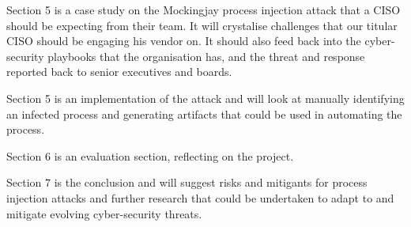 Section 5 is a case study on the Mockingjay process injection attack that a CISO should be expecting from their team.  It will crystalise challenges
that our titular CISO should be engaging his vendor on.  It should also feed back into the cyber-security playbooks that the organisation has, and
the threat and response reported back to senior executives and boards.


Section 5 is an implementation of the attack and will look at manually identifying an infected process and generating artifacts that could be used in automating the process.

Section 6 is an evaluation section, reflecting on the project.

Section 7 is the conclusion and will suggest risks and mitigants for process injection attacks and further research that could be undertaken to adapt to
and mitigate evolving cyber-security threats.